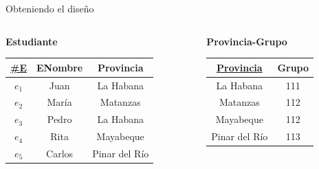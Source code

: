 \begin{frame}{Obteniendo el dise\~no}
    \begin{columns}[T]
        \begin{column}{0.68\linewidth}
            \begin{columns}[T]
                \begin{column}{0.6\textwidth}
                    \begin{center}
                        \textbf{Estudiante}\\[2mm]
        
                        \begin{tabular}{ccc}
                            \underline{\#E} & ENombre & Provincia\\[1mm]
                            \hline
                            $e_1$ & Juan & La Habana\\
                            $e_2$ & Mar\'ia & Matanzas\\
                            $e_3$ & Pedro & La Habana\\
                            $e_4$ & Rita & Mayabeque\\
                            $e_5$ & Carlos & Pinar del R\'io
                        \end{tabular}
                    \end{center}
                \end{column}

                \begin{column}{0.4\textwidth}
                    \begin{center}
                        \textbf{Provincia-Grupo}\\[2mm]
        
                        \begin{tabular}{cc}
                            \underline{Provincia} & Grupo\\[1mm]
                            \hline
                            La Habana & 111\\
                            Matanzas & 112 \\
                            Mayabeque & 112 \\
                            Pinar del R\'io & 113
                            
                        \end{tabular}
                    \end{center}
                \end{column}
                

\end{columns}
\end{column}
\end{columns}
\end{frame}
